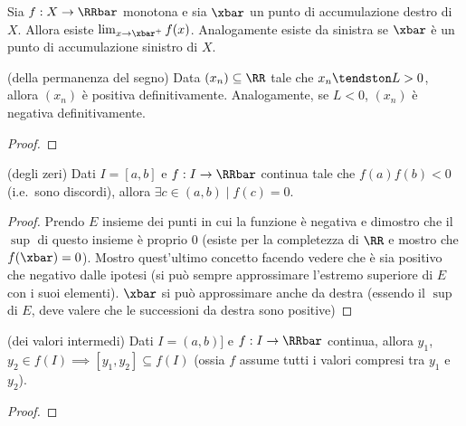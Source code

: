 \documentclass[11pt]{article}
\begin{document}
	\begin{proposition}
		Sia $f : X \to \RRbar$ monotona e sia $\xbar$ un punto di
		accumulazione destro di $X$. Allora esiste $\lim_{x \to \xbar^+} f(x)$.
		Analogamente esiste da sinistra se $\xbar$ è un punto di
		accumulazione sinistro di $X$.
	\end{proposition}

	
	
	\begin{theorem} (della permanenza del segno)
		Data $(x_n) \subseteq \RR$ tale che $x_n \tendston L > 0$, allora
		$(x_n)$ è positiva definitivamente. Analogamente, se $L < 0$,
		$(x_n)$ è negativa definitivamente.
	\end{theorem}

	\begin{proof}
	\end{proof}
	
	\begin{theorem} (degli zeri) Dati $I = [a, b]$ e
		$f : I \to \RRbar$ continua tale che $f(a) f(b) < 0$ (i.e.~sono discordi), allora $\exists c \in (a, b) \mid f(c) = 0$.
	\end{theorem}

	\begin{proof}
		Prendo $E$ insieme dei punti in cui la funzione è negativa e
		dimostro che il $\sup$ di questo insieme è proprio $0$ (esiste
		per la completezza di $\RR$ e mostro che $f(\xbar) = 0$). Mostro
		quest'ultimo concetto facendo vedere che è sia positivo che
		negativo dalle ipotesi (si può sempre approssimare l'estremo
		superiore di $E$ con i suoi elementi). $\xbar$ si può approssimare
		anche da destra (essendo il $\sup$ di $E$, deve valere che le
		successioni da destra sono positive)
	\end{proof}

	\begin{corollary} (dei valori intermedi) Dati $I = (a, b)]$ e
		$f : I \to \RRbar$ continua, allora $y_1$, $y_2 \in f(I) \implies
		[y_1, y_2] \subseteq f(I)$ (ossia $f$ assume tutti i valori
		compresi tra $y_1$ e $y_2$).
	\end{corollary}

	\begin{proof}
		
	\end{proof}
\end{document}
